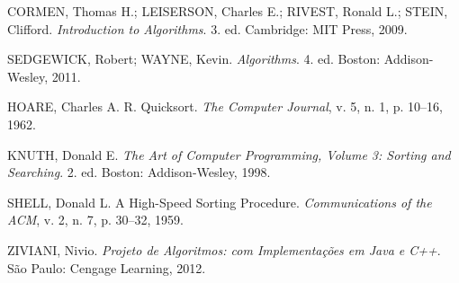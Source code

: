 CORMEN, Thomas H.; LEISERSON, Charles E.; RIVEST, Ronald L.; STEIN,
Clifford. \textit{Introduction to Algorithms}. 3. ed. Cambridge:
MIT Press, 2009.

SEDGEWICK, Robert; WAYNE, Kevin. \textit{Algorithms}. 4. ed.
Boston: Addison-Wesley, 2011.

HOARE, Charles A. R. Quicksort. \textit{The Computer Journal}, v. 5,
n. 1, p. 10--16, 1962.

KNUTH, Donald E. \textit{The Art of Computer Programming, Volume 3:
Sorting and Searching}. 2. ed. Boston: Addison-Wesley, 1998.

SHELL, Donald L. A High-Speed Sorting Procedure. \textit{Communications
of the ACM}, v. 2, n. 7, p. 30–32, 1959.

ZIVIANI, Nivio. \textit{Projeto de Algoritmos: com Implementações em
Java e C++}. São Paulo: Cengage Learning, 2012.
